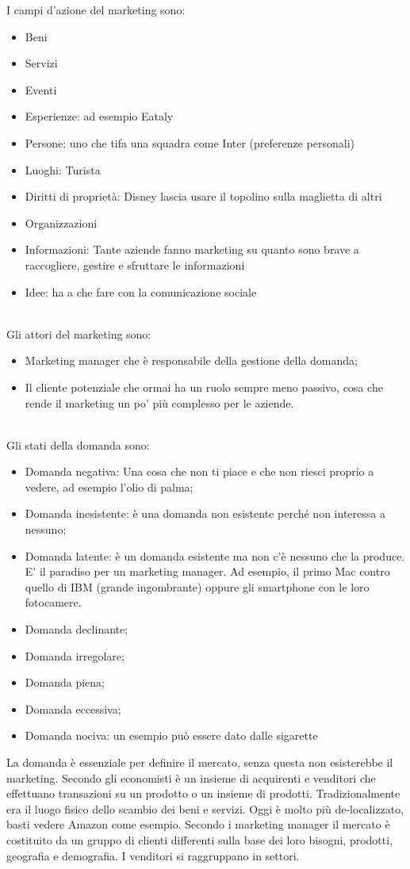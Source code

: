 \documentclass[11pt]{article}
\begin{document}
\noindent
I campi d'azione del marketing sono:
\begin{itemize}[noitemsep,topsep=0ex]
	\item Beni
	\item Servizi
	\item Eventi
	\item Esperienze: ad esempio Eataly
	\item Persone: uno che tifa una squadra come Inter (preferenze personali)
	\item Luoghi: Turista
	\item Diritti di proprietà: Disney lascia usare il topolino sulla maglietta di altri
	\item Organizzazioni
	\item Informazioni: Tante aziende fanno marketing su quanto sono brave a raccogliere, gestire e sfruttare le informazioni
	\item Idee: ha a che fare con la comunicazione sociale
\end{itemize}
~\\
Gli attori del marketing sono:
\begin{itemize}[noitemsep,topsep=0ex]
	\item Marketing manager che è responsabile della gestione della domanda;
	\item Il cliente potenziale che ormai ha un ruolo sempre meno passivo, cosa che rende il marketing un po' più complesso per le aziende.
\end{itemize}
~\\
Gli stati della domanda sono:
\begin{itemize}[noitemsep,topsep=0ex]
	\item Domanda negativa: Una cosa che non ti piace e che non riesci proprio a vedere, ad esempio l'olio di palma;
	\item Domanda inesistente: è una domanda non esistente perché non interessa a nessuno;
	\item Domanda latente: è un domanda esistente ma non c'è nessuno che la produce. E' il paradiso per un marketing manager. Ad esempio, il primo Mac contro quello di IBM (grande ingombrante) oppure gli smartphone con le loro fotocamere.
	\item Domanda declinante;
	\item Domanda irregolare;
	\item Domanda piena;
	\item Domanda eccessiva;
	\item Domanda nociva: un esempio può essere dato dalle sigarette
\end{itemize}
\noindent
La domanda è essenziale per definire il mercato, senza questa non esisterebbe il marketing.
Secondo gli economisti è un insieme di acquirenti e venditori che effettuano transazioni su un prodotto o un insieme di prodotti.
Tradizionalmente era il luogo fisico dello scambio dei beni e servizi. 
Oggi è molto più de-localizzato, basti vedere Amazon come esempio.
Secondo i marketing manager il mercato è costituito da un gruppo di clienti differenti sulla base dei loro bisogni, prodotti, geografia e demografia. I venditori si raggruppano in settori. 
~\\
\end{document}
